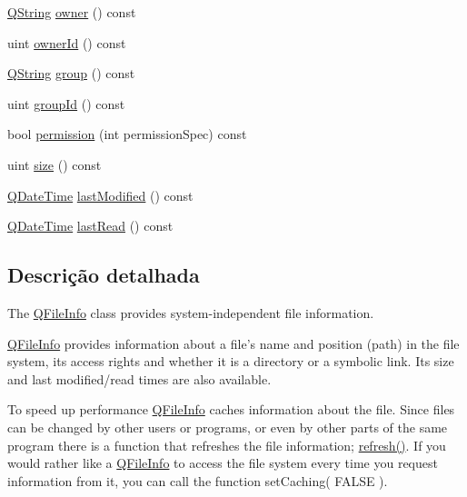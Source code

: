\begin{DoxyCompactItemize}
\item 
\hyperlink{class_q_string}{Q\-String} \hyperlink{class_q_file_info_a7ac38ab076af4a7bb571c9f75a32c356}{owner} () const 
\item 
uint \hyperlink{class_q_file_info_a9231e0829f74984cabed8a61dc2de70a}{owner\-Id} () const 
\item 
\hyperlink{class_q_string}{Q\-String} \hyperlink{class_q_file_info_a5adb315467de1866550658b4679bf9f9}{group} () const 
\item 
uint \hyperlink{class_q_file_info_adee212f2168dc404d4c9ee3de6d1aed8}{group\-Id} () const 
\item 
bool \hyperlink{class_q_file_info_a1e7f0679de12ab87e71375e36873b283}{permission} (int permission\-Spec) const 
\item 
uint \hyperlink{class_q_file_info_a7e63723212bed1ca52f0fe57e58b812e}{size} () const 
\item 
\hyperlink{class_q_date_time}{Q\-Date\-Time} \hyperlink{class_q_file_info_ac6ecd769e444eef4ba0ad13234364796}{last\-Modified} () const 
\item 
\hyperlink{class_q_date_time}{Q\-Date\-Time} \hyperlink{class_q_file_info_a2de588fafa2059e2f8a030ba3a9f5795}{last\-Read} () const 
\end{DoxyCompactItemize}


\subsection{Descrição detalhada}
The \hyperlink{class_q_file_info}{Q\-File\-Info} class provides system-\/independent file information. 

\hyperlink{class_q_file_info}{Q\-File\-Info} provides information about a file's name and position (path) in the file system, its access rights and whether it is a directory or a symbolic link. Its size and last modified/read times are also available.

To speed up performance \hyperlink{class_q_file_info}{Q\-File\-Info} caches information about the file. Since files can be changed by other users or programs, or even by other parts of the same program there is a function that refreshes the file information; \hyperlink{class_q_file_info_a2e63ff3187dd2bb1baee24e5985e06a2}{refresh()}. If you would rather like a \hyperlink{class_q_file_info}{Q\-File\-Info} to access the file system every time you request information from it, you can call the function set\-Caching( F\-A\-L\-S\-E ).

